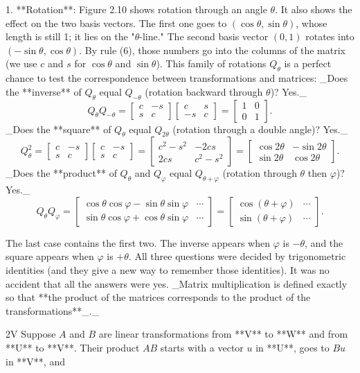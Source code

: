 1. **Rotation**: Figure 2.10 shows rotation through an angle \(\theta\). It also shows the effect on the two basis vectors. The first one goes to \((\cos\theta,\sin\theta)\), whose length is still 1; it lies on the "\(\theta\)-line." The second basis vector \((0,1)\) rotates into \((-\sin\theta,\cos\theta)\). By rule (6), those numbers go into the columns of the matrix (we use \(c\) and \(s\) for \(\cos\theta\) and \(\sin\theta\)). This family of rotations \(Q_{\theta}\) is a perfect chance to test the correspondence between transformations and matrices: _Does the **inverse** of \(Q_{\theta}\) equal \(Q_{-\theta}\) (rotation backward through \(\theta\))? Yes._ \[Q_{\theta}Q_{-\theta}=\begin{bmatrix}c&-s\\ s&c\end{bmatrix}\begin{bmatrix}c&s\\ -s&c\end{bmatrix}=\begin{bmatrix}1&0\\ 0&1\end{bmatrix}.\] _Does the **square** of \(Q_{\theta}\) equal \(Q_{2\theta}\) (rotation through a double angle)? Yes._ \[Q_{\theta}^{2}=\begin{bmatrix}c&-s\\ s&c\end{bmatrix}\begin{bmatrix}c&-s\\ s&c\end{bmatrix}=\begin{bmatrix}c^{2}-s^{2}&-2cs\\ 2cs&c^{2}-s^{2}\end{bmatrix}=\begin{bmatrix}\cos 2\theta&-\sin 2\theta\\ \sin 2\theta&\cos 2\theta\end{bmatrix}.\] _Does the **product** of \(Q_{\theta}\) and \(Q_{\varphi}\) equal \(Q_{\theta+\varphi}\) (rotation through \(\theta\) then \(\varphi\))? Yes._ \[Q_{\theta}Q_{\varphi}=\begin{bmatrix}\cos\theta\cos\varphi-\sin\theta\sin \varphi&\cdots\\ \sin\theta\cos\varphi+\cos\theta\sin\varphi&\cdots\end{bmatrix}=\begin{bmatrix} \cos(\theta+\varphi)&\cdots\\ \sin(\theta+\varphi)&\cdots\end{bmatrix}.\]

The last case contains the first two. The inverse appears when \(\varphi\) is \(-\theta\), and the square appears when \(\varphi\) is \(+\theta\). All three questions were decided by trigonometric identities (and they give a new way to remember those identities). It was no accident that all the answers were yes. _Matrix multiplication is defined exactly so that **the product of the matrices corresponds to the product of the transformations**_._

2V Suppose \(A\) and \(B\) are linear transformations from **V** to **W** and from **U** to **V**. Their product \(AB\) starts with a vector \(u\) in **U**, goes to \(Bu\) in **V**, and